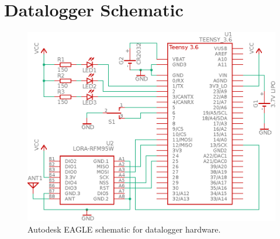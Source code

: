 \chapter{Datalogger Schematic}
\begin{figure}[H]
    \centering
    \includegraphics[width=\textwidth]{Figures/datalogger_schematic}
    \caption[Datalogger schematic]{Autodesk EAGLE schematic for datalogger hardware.}
    \label{fig:datalogger_schematic}
\end{figure}
